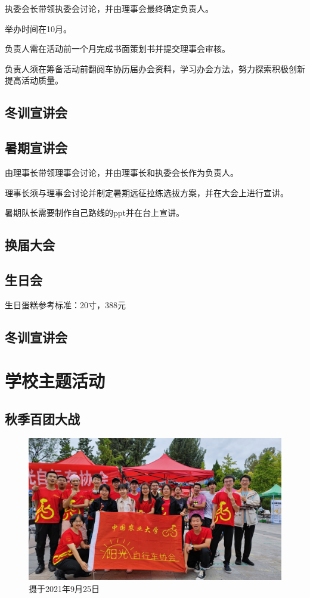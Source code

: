 \documentclass{ctexbook}
\begin{document}
执委会长带领执委会讨论，并由理事会最终确定负责人。

    举办时间在10月。

    负责人需在活动前一个月完成书面策划书并提交理事会审核。

    负责人须在筹备活动前翻阅车协历届办会资料，学习办会方法，努力探索积极创新提高活动质量。

\subsection{冬训宣讲会}


\subsection{暑期宣讲会}
   由理事长带领理事会讨论，并由理事长和执委会长作为负责人。

   理事长须与理事会讨论并制定暑期远征拉练选拔方案，并在大会上进行宣讲。

   暑期队长需要制作自己路线的ppt并在台上宣讲。
\subsection{换届大会}

\subsection{生日会}
    生日蛋糕参考标准：20寸，388元

\subsection{冬训宣讲会}


\section{学校主题活动}
\subsection{秋季百团大战}
\begin{figure}[H]
    \centering
    \includegraphics[width=0.7\linewidth]{fig/百团大战}
    \caption{摄于2021年9月25日}
    \label{fig:}
\end{figure}
\end{document}
